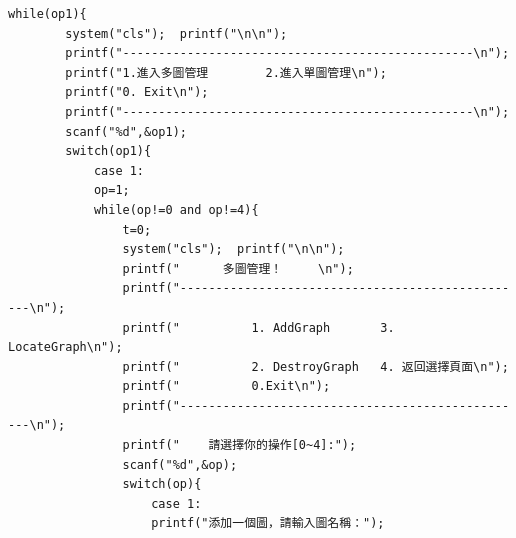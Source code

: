 \documentclass[supercite]{Experimental_Report}
\theoremstyle{definition}
\begin{document}
\begin{lstlisting}[style=commonCodeStyle, caption={目标程序}, label={lst:2-17}]
	while(op1){
		system("cls");  printf("\n\n");
		printf("-------------------------------------------------\n");
		printf("1.進入多圖管理        2.進入單圖管理\n");
		printf("0. Exit\n");
		printf("-------------------------------------------------\n");
		scanf("%d",&op1);   
		switch(op1){
			case 1:
			op=1;
			while(op!=0 and op!=4){
				t=0;
				system("cls");  printf("\n\n");
				printf("      多圖管理！     \n");           
				printf("-------------------------------------------------\n");
				printf("          1. AddGraph       3. LocateGraph\n");
				printf("          2. DestroyGraph   4. 返回選擇頁面\n");      
				printf("          0.Exit\n");   
				printf("-------------------------------------------------\n");
				printf("    請選擇你的操作[0~4]:");        
				scanf("%d",&op);
				switch(op){
					case 1:
					printf("添加一個圖，請輸入圖名稱：");
					

\end{lstlisting}
\end{document}

